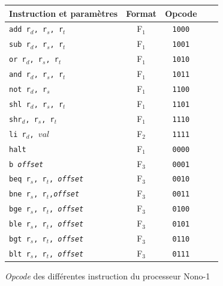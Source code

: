 \documentclass[a4paper]{article}
\begin{document}
			\begin{figure}
			\centering
			\begin{tabular}{|p{4cm}|c|c|c|c|}
				\hline Instruction et paramètres & Format & Opcode  \\ 
				\hline \texttt{add r$_{d}$, r$_{s}$, r$_{t}$} & F$_{1}$ & \texttt{1000} \\ 
				\hline \texttt{sub r$_{d}$, r$_{s}$, r$_{t}$} & F$_{1}$ & \texttt{1001}  \\ 
				\hline \texttt{or r$_{d}$, r$_{s}$, r$_{t}$} & F$_{1}$ & \texttt{1010}  \\ 
				\hline \texttt{and r$_{d}$, r$_{s}$, r$_{t}$} & F$_{1}$ & \texttt{1011}  \\ 
				\hline \texttt{not r$_{d}$, r$_{s}$} & F$_{1}$ & \texttt{1100} \\ 
				\hline \texttt{shl r$_{d}$, r$_{s}$, r$_{t}$} & F$_{1}$ & \texttt{1101} \\ 
				\hline \texttt{shr$_{d}$, r$_{s}$, r$_{t}$} & F$_{1}$ & \texttt{1110} \\ 
				\hline \texttt{li r$_{d}$, $val$} & F$_{2}$ & \texttt{1111} \\ 
				\hline \texttt{halt} & F$_{1}$ & \texttt{0000} \\ 
				\hline \texttt{b \textit{offset}} & F$_{3}$ & \texttt{0001} \\
				\hline \texttt{beq r$_{s}$, r$_{t}$, \textit{offset}} & F$_{3}$ & \texttt{0010} \\ 
				\hline \texttt{bne r$_{s}$, r$_{t}$,\textit{offset}} & F$_{3}$ & \texttt{0011} \\ 
				\hline \texttt{bge r$_{s}$, r$_{t}$, \textit{offset}} & F$_{3}$ & \texttt{0100} \\ 
				\hline \texttt{ble r$_{s}$, r$_{t}$, \textit{offset}} & F$_{3}$ & \texttt{0101} \\ 
				\hline \texttt{bgt r$_{s}$, r$_{t}$, \textit{offset}} & F$_{3}$ & \texttt{0110} \\ 
				\hline \texttt{blt r$_{s}$, r$_{t}$, \textit{offset}} & F$_{3}$ & \texttt{0111} \\ 
				\hline 
				\end{tabular}
			\label{tab_opcode}
			\caption{\textit{Opcode} des différentes instruction du processeur Nono-1}
			\end{figure}
			
			\paragraph{}{}
	
\end{document}

